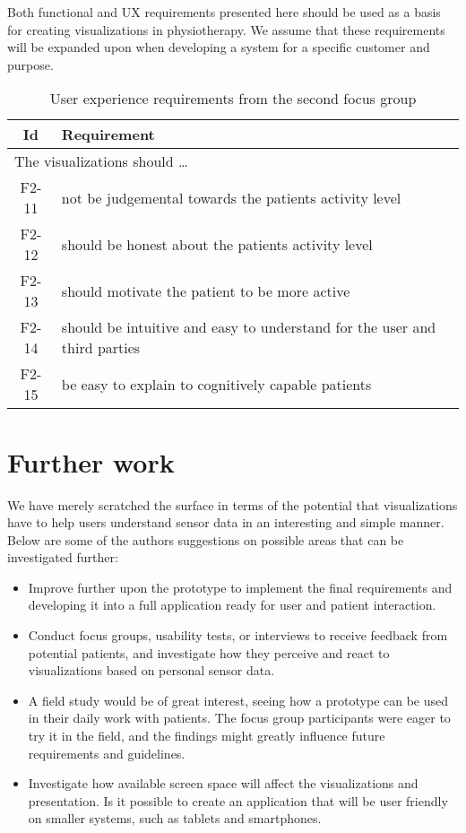 Both functional and UX requirements presented here should be used as a basis for creating visualizations in physiotherapy. We assume that these requirements will be expanded upon when developing a system for a specific customer and purpose.

\begin{table}[h!]
  \begin{center}
  \begin{tabular}{|c|p{12cm}|}
    \hline
      \textbf{Id} & \textbf{Requirement} \\ \hline
    \multicolumn{2}{|l|}{The visualizations should \ldots} \\ \hline
      F2-11 & not be judgemental towards the patients activity level \\ \hline
      F2-12 & should be honest about the patients activity level \\ \hline
      F2-13 & should motivate the patient to be more active \\ \hline
      F2-14 & should be intuitive and easy to understand for the user and third parties \\ \hline
      F2-15 & be easy to explain to cognitively capable patients \\ \hline
  \end{tabular}
  \end{center}
  \caption{User experience requirements from the second focus group}
  \label{tab:f2ReqUxCon}
\end{table}

\section{Further work}
We have merely scratched the surface in terms of the potential that visualizations have to help users understand sensor data in an interesting and simple manner. Below are some of the authors suggestions on possible areas that can be investigated further:

\begin{itemize}
  \item Improve further upon the prototype to implement the final requirements and developing it into a full application ready for user and patient interaction.
  \item Conduct focus groups, usability tests, or interviews to receive feedback from potential patients, and investigate how they perceive and react to visualizations based on personal sensor data.
  \item A field study would be of great interest, seeing how a prototype can be used in their daily work with patients. The focus group participants were eager to try it in the field, and the findings might greatly influence future requirements and guidelines.
  \item Investigate how available screen space will affect the visualizations and presentation. Is it possible to create an application that will be user friendly on smaller systems, such as tablets and smartphones.
\end{itemize}

